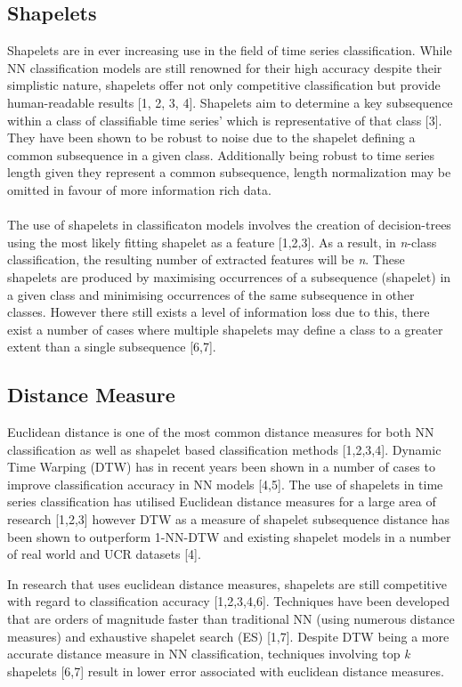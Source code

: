 \documentclass[10pt,a4paper]{article}
\begin{document}
\subsection{Shapelets}
Shapelets are in ever increasing use in the field of time series classification.
While NN classification models are still renowned for their high accuracy despite their simplistic nature, shapelets offer not only competitive classification but provide human-readable results [1, 2, 3, 4]. 
Shapelets aim to determine a key subsequence within a class of classifiable time series' which is representative of that class [3].
They have been shown to be robust to noise due to the shapelet defining a common subsequence in a given class.
Additionally being robust to time series length given they represent a common subsequence, length normalization may be omitted in favour of more information rich data.
\\\\
The use of shapelets in classificaton models involves the creation of decision-trees using  the most likely fitting shapelet as a feature [1,2,3].
As a result, in \textit{n}-class classification, the resulting number of extracted features will be \textit{n}.
These shapelets are produced by maximising occurrences of a subsequence (shapelet) in a given class and minimising occurrences of the same subsequence in other classes.
However there still exists a level of information loss due to this, there exist a number of cases where multiple shapelets may define a class to a greater extent than a single subsequence [6,7].
\\

\subsection{Distance Measure}
Euclidean distance is one of the most common distance measures for both NN classification as well as shapelet based classification methods [1,2,3,4].
Dynamic Time Warping (DTW) has in recent years been shown in a number of cases to improve classification accuracy in NN models [4,5].
The use of shapelets in time series classification has utilised Euclidean distance measures for a large area of research [1,2,3] however DTW as a measure of shapelet subsequence distance has been shown to outperform 1-NN-DTW and existing shapelet models in a number of real world and UCR datasets [4].

In research that uses euclidean distance measures, shapelets are still competitive with regard to classification accuracy [1,2,3,4,6]. 
Techniques have been developed that are orders of magnitude faster than traditional NN (using numerous distance measures) and exhaustive shapelet search (ES) [1,7].
Despite DTW being a more accurate distance measure in NN classification, techniques involving top \textit{k} shapelets [6,7] result in lower error associated with euclidean distance measures.
\\
\end{document}
